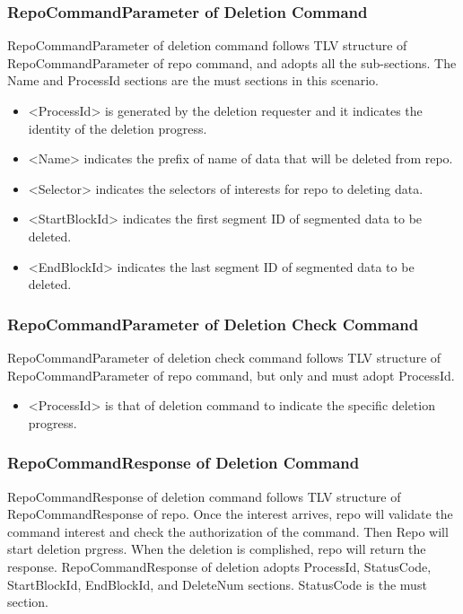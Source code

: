 \documentclass{acm_proc_article-sp}
\begin{document}
\subsubsection{RepoCommandParameter of Deletion Command}
RepoCommandParameter of deletion command follows TLV structure of RepoCommandParameter of repo command, and adopts all the sub-sections. The Name and ProcessId sections are the must sections in this scenario.

\begin{itemize}
\item <ProcessId> is generated by the deletion requester and it indicates the identity of the deletion progress.
\item <Name> indicates the prefix of name of data that will be deleted from repo.
\item <Selector> indicates the selectors of interests for repo to deleting data.
\item <StartBlockId> indicates the first segment ID of segmented data to be deleted.
\item <EndBlockId> indicates the last segment ID of segmented data to be deleted.
\end{itemize}

\subsubsection{RepoCommandParameter of Deletion Check Command}
RepoCommandParameter of deletion check command follows TLV structure of RepoCommandParameter of repo command, but only and must adopt ProcessId.

\begin{itemize}
\item <ProcessId> is that of deletion command to indicate the specific deletion progress.
\end{itemize}


\subsubsection{RepoCommandResponse of Deletion Command}
RepoCommandResponse of deletion command follows TLV structure of RepoCommandResponse of repo. Once the interest arrives, repo will validate the command interest and check the authorization of the command. Then Repo will start deletion prgress. When the deletion is complished, repo will return the response. RepoCommandResponse of deletion adopts ProcessId, StatusCode, StartBlockId, EndBlockId, and DeleteNum sections. StatusCode is the must section.
\end{document}
